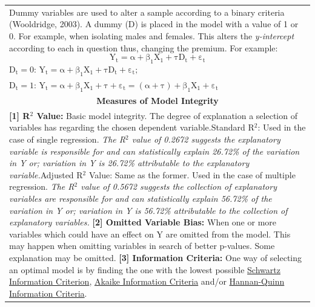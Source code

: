 \documentclass[11pt, english]{article}
\begin{document}
\begin{center}
\begin{longtable}{p{14cm}}
			\hline
			Dummy variables are used to alter a sample according to a binary criteria (Wooldridge, 2003). A dummy (D) is placed in the model with a value of 1 or 0. For example, when isolating males and females. This alters the \textit{y-intercept} according to each in question thus, changing the premium. For example:
                	$$\mathrm{Y_t=\alpha+\beta_1X_1+\tau D_t+\varepsilon_t}$$
			$\mathrm{D_t=0}$: $\mathrm{Y_t=\alpha+\beta_1X_1+\tau D_t+\varepsilon_t;}$\\ $\mathrm{D_t=1}$: $\mathrm{Y_t=\alpha+\beta_1X_1+\tau+\varepsilon_t=(\alpha+\tau)+\beta_1X_1+\varepsilon_t}$\\
			\hline
			\hline
			\multicolumn{1}{c}{\textbf{Measures of Model Integrity}}\\
			\hline
			\hline
			\textbf{[1] R$^2$ Value: }Basic model integrity. The degree of explanation a selection of variables has regarding the chosen dependent variable.\newline\newline
			[1.1] Standard R$^2$: Used in the case of single regression.\newline\newline
			\textit{The R$^2$ value of 0.2672 suggests the explanatory variable is responsible for and can statistically explain 26.72\% of the variation in Y or; variation in Y is 26.72\% attributable to the explanatory variable.}\newline\newline
			[1.2] Adjusted R$^2$ Value: Same as the former. Used in the case of multiple regression.\newline\newline
			\textit{The R$^2$ value of 0.5672 suggests the collection of explanatory variables are responsible for and can statistically explain 56.72\% of the variation in Y or; variation in Y is 56.72\% attributable to the collection of explanatory variables.}\newline\newline
			\textbf{[2] Omitted Variable Bias: }When one or more variables which could have an effect on Y are omitted from the model. This may happen when omitting variables in search of better p-values. Some explanation may be omitted.\newline\newline
			\textbf{[3] Information Criteria: }One way of selecting an optimal model is by finding the one with the lowest possible \underline{Schwartz Information Criterion}, \underline{Akaike Information Criteria} and/or \underline{Hannan-Quinn Information Criteria}.\\

\end{longtable}
\end{center}
\end{document}
